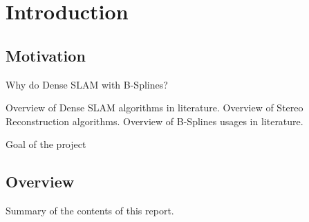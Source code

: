 \chapter{Introduction}
\section{Motivation}

Why do Dense SLAM with B-Splines?

Overview of Dense SLAM algorithms in literature.
Overview of Stereo Reconstruction algorithms.
Overview of B-Splines usages in literature.

Goal of the project

\section{Overview}

Summary of the contents of this report.
